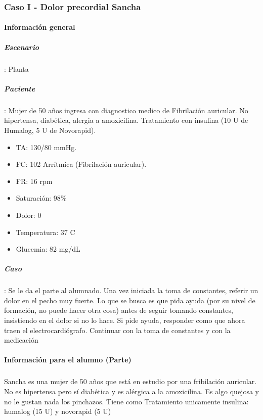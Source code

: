 \subsubsection{Caso I - Dolor precordial Sancha}
    \begin{multicols}{2}
        \paragraph{Información general}
        \subparagraph{Escenario}: Planta
        \subparagraph{Paciente}: Mujer de 50 años ingresa con diagnostico medico de Fibrilación auricular. No hipertensa, diabética, alergia a amoxicilina. Tratamiento con insulina (10 U de Humalog, 5 U de Novorapid).
        \begin{itemize}[topsep=0pt, partopsep=0pt,itemsep=0pt,parsep=0pt]
            \item TA: 130/80 mmHg.
            \item FC: 102 Arrítmica (Fibrilación auricular).
            \item FR: 16 rpm
            \item Saturación: 98\%
            \item Dolor: 0
            \item Temperatura: 37 C
            \item Glucemia: 82 mg/dL
        \end{itemize}
        \subparagraph{Caso}: Se le da el parte al alumnado. Una vez iniciada la toma de constantes, referir un dolor en el pecho muy fuerte. Lo que se busca es que pida ayuda (por su nivel de formación, no puede hacer otra cosa) antes de seguir tomando constantes, insistiendo en el dolor si no lo hace. Si pide ayuda, responder como que ahora traen el electrocardiógrafo. Continuar con la toma de constantes y con la medicación
        \columnbreak
        \paragraph{Información para el alumno (Parte)}
        \subparagraph{} Sancha es una mujer de 50 años que está en estudio por una fribilación auricular. No es hipertensa pero sí diabética y es alérgica a la amoxicilina. Es algo quejosa y no le gustan nada los pinchazos. Tiene como Tratamiento unicamente insulina: humalog (15 U) y novorapid (5 U)
    \end{multicols}
